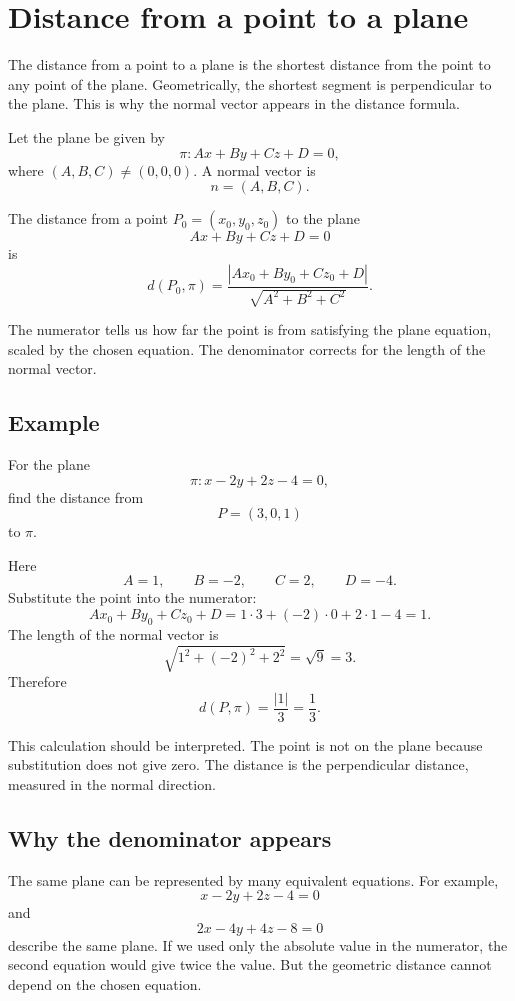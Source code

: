 \section{Distance from a point to a plane}

The distance from a point to a plane is the shortest distance from the point to any point of the plane. Geometrically, the shortest segment is perpendicular to the plane. This is why the normal vector appears in the distance formula.

Let the plane be given by
\[
\pi:Ax+By+Cz+D=0,
\]
where \((A,B,C)\ne(0,0,0)\). A normal vector is
\[
n=(A,B,C).
\]

\begin{theorembox}
The distance from a point \(P_0=(x_0,y_0,z_0)\) to the plane
\[
Ax+By+Cz+D=0
\]
is
\[
d(P_0,\pi)=\frac{|Ax_0+By_0+Cz_0+D|}{\sqrt{A^2+B^2+C^2}}.
\]
\end{theorembox}

The numerator tells us how far the point is from satisfying the plane equation, scaled by the chosen equation. The denominator corrects for the length of the normal vector.

\subsection*{Example}

\begin{examplebox}
For the plane
\[
\pi:x-2y+2z-4=0,
\]
find the distance from
\[
P=(3,0,1)
\]
to \(\pi\).

Here
\[
A=1,
\qquad
B=-2,
\qquad
C=2,
\qquad
D=-4.
\]
Substitute the point into the numerator:
\[
Ax_0+By_0+Cz_0+D=1\cdot3+(-2)\cdot0+2\cdot1-4=1.
\]
The length of the normal vector is
\[
\sqrt{1^2+(-2)^2+2^2}=\sqrt9=3.
\]
Therefore
\[
d(P,\pi)=\frac{|1|}{3}=\frac13.
\]
\end{examplebox}

This calculation should be interpreted. The point is not on the plane because substitution does not give zero. The distance is the perpendicular distance, measured in the normal direction.

\subsection*{Why the denominator appears}

The same plane can be represented by many equivalent equations. For example,
\[
x-2y+2z-4=0
\]
and
\[
2x-4y+4z-8=0
\]
describe the same plane. If we used only the absolute value in the numerator, the second equation would give twice the value. But the geometric distance cannot depend on the chosen equation.

